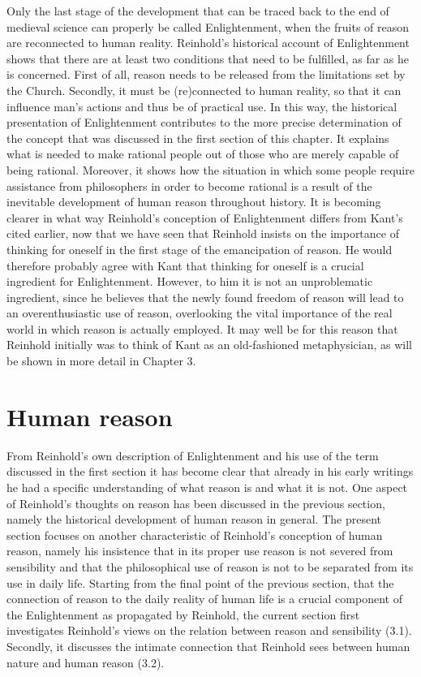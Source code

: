 Only the last stage of the development that can be traced back to the end of medieval science can properly be called Enlightenment, when the fruits of reason are reconnected to human reality. Reinhold's historical account of Enlightenment shows that there are at least two conditions that need to be fulfilled, as far as he is concerned. First of all, reason needs to be released from the limitations set by the Church. Secondly, it must be (re)connected to human reality, so that it can influence man's actions and thus be of practical use. In this way, the historical presentation of Enlightenment contributes to the more precise determination of the concept that was discussed in the first section of this chapter. It explains what is needed to make rational people out of those who are merely capable of being rational. Moreover, it shows how the situation in which some people require assistance from philosophers in order to become rational is a result of the inevitable development of human reason throughout history. It is becoming clearer in what way Reinhold's conception of Enlightenment differs from Kant's cited earlier, now that we have seen that Reinhold insists on the importance of thinking for oneself in the first stage of the emancipation of reason. He would therefore probably agree with Kant that thinking for oneself is a crucial ingredient for Enlightenment. However, to him it is not an unproblematic ingredient, since he believes that the newly found freedom of reason will lead to an overenthusiastic use of reason, overlooking the vital importance of the real world in which reason is actually employed. It may well be for this reason that Reinhold initially was to think of Kant as an old{-}fashioned metaphysician, as will be shown in more detail in Chapter 3. 


\section{Human reason }


From Reinhold's own description of Enlightenment and his use of the term discussed in the first section it has become clear that already in his early writings he had a specific understanding of what reason is and what it is not. One aspect of Reinhold's thoughts on reason has been discussed in the previous section, namely the historical development of human reason in general. The present section focuses on another characteristic of Reinhold's conception of human reason, namely his insistence that in its proper use reason is not severed from sensibility and that the philosophical use of reason is not to be separated from its use in daily life. Starting from the final point of the previous section, that the connection of reason to the daily reality of human life is a crucial component of the Enlightenment as propagated by Reinhold, the current section first investigates Reinhold's views on the relation between reason and sensibility (3.1). Secondly, it discusses the intimate connection that Reinhold sees between human nature and human reason (3.2).


